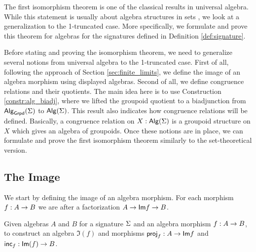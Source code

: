 The first isomorphism theorem is one of the classical results in universal algebra.
While this statement is usually about algebra structures in sets \cite{lynge2019}, we look at a generalization to the 1-truncated case.
More specifically, we formulate and prove this theorem for algebras for the signatures defined in Definition \ref{def:signature}.

Before stating and proving the isomorphism theorem, we need to generalize several notions from universal algebra to the 1-truncated case.
First of all, following the approach of Section \ref{sec:finite_limits}, we define the image of an algebra morphism using displayed algebras.
Second of all, we define congruence relations and their quotients.
The main idea here is to use Construction \ref{constr:alg_biadj}, where
we lifted the groupoid quotient to a biadjunction from $\mathsf{Alg}_{\mathsf{Grpd}}(\Sigma)$ to $\mathsf{Alg}(\Sigma)$.
This result also indicates how congruence relations will be defined.
Basically, a congruence relation on $X : \mathsf{Alg}(\Sigma)$ is a groupoid structure on $X$ which gives an algebra of groupoids.
Once these notions are in place, we can formulate and prove the first isomorphism theorem similarly to the set-theoretical version.

\subsection{The Image}
We start by defining the image of an algebra morphism.
For each morphism $f : A \rightarrow B$ we are after a factorization $A \rightarrow \mathsf{Im}{f} \rightarrow B$.

\begin{problem}
\label{prob:image}
Given algebras $A$ and $B$ for a signature $\Sigma$ and an algebra morphism $f : A \rightarrow B$,
to construct an algebra $\Im(f)$ and morphisms $\mathsf{proj}_{f} : A \rightarrow \mathsf{Im}{f}$ and $\mathsf{inc}_{f} : \mathsf{Im}(f) \rightarrow B$. 
\end{problem}

